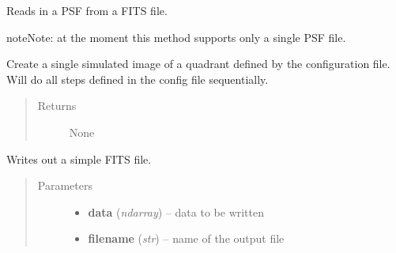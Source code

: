 \documentclass[a4paper,12pt,english]{sphinxmanual}
\begin{document}
\begin{fulllineitems}
\begin{fulllineitems}
\end{fulllineitems}


\begin{fulllineitems}
\label{simulator:simulator.simulator.VISsimulator.readPSFs}
Reads in a PSF from a FITS file.

\begin{notice}{note}{Note:}
at the moment this method supports only a single PSF file.
\end{notice}

\end{fulllineitems}


\begin{fulllineitems}
\label{simulator:simulator.simulator.VISsimulator.simulate}
Create a single simulated image of a quadrant defined by the configuration file.
Will do all steps defined in the config file sequentially.
\begin{quote}\begin{description}
\item[{Returns}] \leavevmode
None

\end{description}\end{quote}

\end{fulllineitems}


\begin{fulllineitems}
\label{simulator:simulator.simulator.VISsimulator.writeFITSfile}
Writes out a simple FITS file.
\begin{quote}\begin{description}
\item[{Parameters}] \leavevmode\begin{itemize}
\item {} 
\textbf{data} (\emph{ndarray}) -- data to be written

\item {} 
\textbf{filename} (\emph{str}) -- name of the output file


\end{itemize}
\end{description}
\end{quote}
\end{fulllineitems}
\end{fulllineitems}
\end{document}
